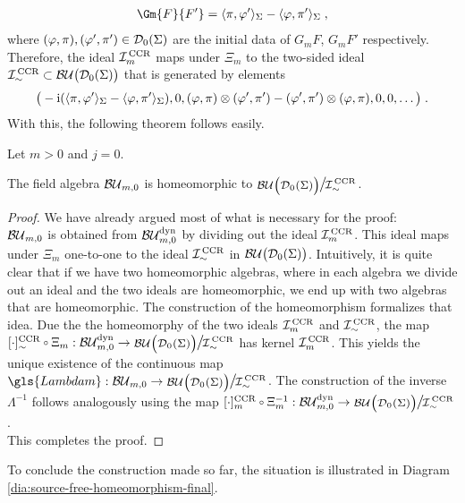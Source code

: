 \begin{align}
\Gm{F}{F'} = \langle \pi , \varphi' \rangle_\Sigma - \langle \varphi, \pi'\rangle_\Sigma \formspace,
\end{align}
where $(\varphi, \pi), (\varphi', \pi') \in \mathcal{D}_{0}(\Sigma)$ are the initial data of $G_m F$, $G_m F'$ respectively.
Therefore, the ideal $\mathcal{I}_m^\text{\,CCR}$ maps under $\Xi_m$ to the two-sided ideal ${\mathcal{I}}_{\sim}^\text{\,CCR} \subset \mathcal{BU}\big( \mathcal{D}_{0}(\Sigma) \big)$ that is generated by elements \vspace{-.3cm}
\begin{align}
\big(-\text{\upshape{i}} ( \langle \pi , \varphi' \rangle_\Sigma - \langle \varphi, \pi'\rangle_\Sigma), 0 , (\varphi, \pi) \otimes (\varphi', \pi') - (\varphi', \pi') \otimes (\varphi, \pi) , 0 , 0 , \dots\big)\;.
\end{align}
With this, the following theorem follows easily.
\begin{theorem}\label{thm:field_algebra_homeomorphy_source_free}
	Let $m>0$ and $j=0$.
	\begin{center}
The field algebra $\mathcal{BU}_{m,0}$ is homeomorphic to ${\Quotientscale{\BU\big( \Dzs \big)}{\ICCR}}$.
	\end{center}
\end{theorem}
\begin{proof}
	We have already argued most of what is necessary for the proof:\\
	$\mathcal{BU}_{m,0}$ is obtained from $\mathcal{BU}_{m,0}^\text{dyn}$ by dividing out the ideal $\mathcal{I}_m^\text{\,CCR}$. This ideal maps under $\Xi_m$ one-to-one to the ideal ${\mathcal{I}}_{\sim}^\text{\,CCR}$ in $\mathcal{BU}\big( \mathcal{D}_{0}(\Sigma)\big)$. 	Intuitively, it is quite clear that if we have two homeomorphic algebras, where in each algebra we divide out an ideal and the two ideals are homeomorphic, we end up with two algebras that are homeomorphic.
	The construction of the homeomorphism formalizes that idea. Due the the homeomorphy of the two ideals $\mathcal{I}_m^\text{\,CCR}$ and ${\mathcal{I}}_{\sim}^\text{\,CCR}$, the map $[\cdot]_\sim^\text{CCR} \comp \Xi_m : \BUmzdyn \to {\Quotientscale{\BU\big( \Dzs \big)}{\ICCR}}$ has kernel $\mathcal{I}_m^\text{\,CCR}$. This yields the unique existence of the continuous map $\gls{Lambdam} : \BUmz \to {\Quotientscale{\BU\big( \Dzs \big)}{\ICCR}}$. The construction of the inverse $\Lambda^{-1}$ follows analogously using the map $[\cdot]_m^\text{CCR} \comp \Xi_m^{-1} : \BUmzdyn \to {\Quotientscale{\BU\big( \Dzs \big)}{\ICCR}}$.\\ This completes the proof.
\end{proof}
To conclude the construction made so far, the situation is illustrated in Diagram \ref{dia:source-free-homeomorphism-final}.
%
